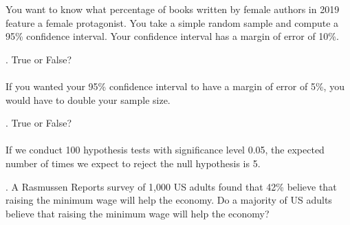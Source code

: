 \documentclass[12pt]{beamer}
\newcommand{\probno}{\insertframenumber. \quad}
\newcommand{\TF}{\probno True or False? \\ \mbox{} \\ }
\begin{document}
\begin{frame}

You want to know what percentage of books written by female authors in 2019 feature a female protagonist. You take a simple random sample and compute a 95\% confidence interval. Your confidence interval has a margin of error of 10\%. 

\mbox{}

\TF If you wanted your 95\% confidence interval to have a margin of error of 5\%, you would have to double your sample size. 

\end{frame}

\begin{frame}
\TF If we conduct 100 hypothesis tests with significance level 0.05, the expected number of times we expect to reject the null hypothesis is 5. 
\end{frame}

\begin{frame}
\probno A Rasmussen Reports survey of 1,000 US adults
found that 42\% believe that raising the minimum wage will help the economy. Do a majority of US adults believe that raising the minimum wage will help the economy? 
\end{frame}
\end{document}
